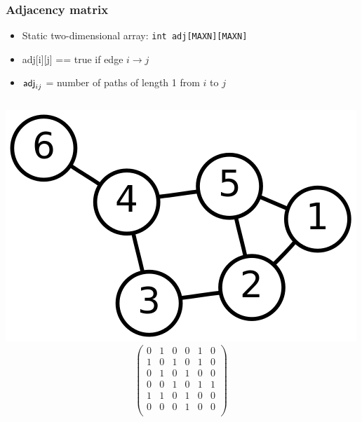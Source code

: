 \documentclass[12pt]{beamer}
\begin{document}
\begin{frame}
\frametitle{Adjacency matrix}
\begin{itemize}
\item Static two-dimensional array: \texttt{int adj[MAXN][MAXN]}
\item adj[i][j] == true if edge $i \to j$
\item $\mathsf{adj}_{ij}$ = number of paths of length 1 from $i$ to $j$
\end{itemize}
\begin{columns}
\flushright
\includegraphics[width=0.85\linewidth]{img/6n-graph}
\[\left(
\begin{array}{cccccc}
0&1&0&0&1&0\\
1&0&1&0&1&0\\
0&1&0&1&0&0\\
0&0&1&0&1&1\\
1&1&0&1&0&0\\
0&0&0&1&0&0\\
\end{array}
\right)\]
\end{columns}
\end{frame}
\end{document}
